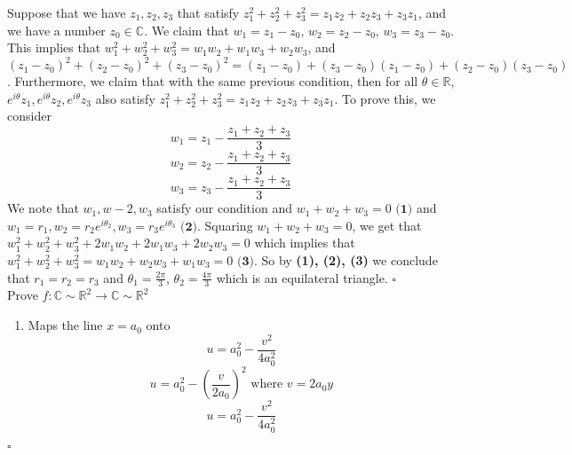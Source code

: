 \documentclass[12pt]{article}
\newcommand{\C}{\mathbb{C}}
\newcommand{\R}{\mathbb{R}}
\newenvironment{proof}{\noindent{\bf Proof.}}{\hfill $\square$\medskip}
\begin{document}
\begin{proof}
Suppose that we have $z_{1},z_{2},z_{3}$ that satisfy $z_{1}^{2}+z_{2}^{2}+z_{3}^{2}=z_{1}z_{2}+z_{2}z_{3}+z_{3}z_{1}$, and we have a number $z_{0}\in\C$. We claim that $w_{1} = z_{1}-z_{0}$, $w_{2}=z_{2}-z_{0}$, $w_{3}=z_{3}-z_{0}$. This implies that $w_{1}^{2}+w_{2}^{2}+w_{3}^{2}=w_{1}w_{2}+w_{1}w_{3}+w_{2}w_{3}$, and $(z_{1}-z_{0})^{2}+(z_{2}-z_{0})^{2}+(z_{3}-z_{0})^{2}=(z_{1}-z_{0})+(z_{3}-z_{0})(z_{1}-z_{0})+(z_{2}-z_{0})(z_{3}-z_{0})$. Furthermore, we claim that with the same previous condition, then for all $\theta\in\R$, $e^{i\theta}z_{1},e^{i\theta}z_{2}, e^{i\theta}z_{3}$ also satisfy $ z_{1}^{2}+z_{2}^{2}+z_{3}^{2}=z_{1}z_{2}+z_{2}z_{3}+z_{3}z_{1}$. To prove this, we consider
$$w_{1}=z_{1}-\frac{z_{1}+z_{2}+z_{3}}{3}$$
$$w_{2}=z_{2}-\frac{z_{1}+z_{2}+z_{3}}{3}$$
$$w_{3}=z_{3}-\frac{z_{1}+z_{2}+z_{3}}{3}$$
We note that $w_{1},w-{2},w_{3}$ satisfy our condition and $w_{1}+w_{2}+w_{3}=0\textbf{ (1)}$ and $w_{1}=r_{1},w_{2}=r_{2}e^{i\theta_{2}}, w_{3}=r_{3}e^{i\theta_{3}}\textbf{ (2)}$. Squaring $w_{1}+w_{2}+w_{3}=0$, we get that $w_{1}^{2}+w_{2}^{2}+w_{3}^{2}+2w_{1}w_{2}+2w_{1}w_{3}+2w_{2}w_{3}=0$ which implies that $w_{1}^{2}+w_{2}^{2}+w_{3}^{2}=w_{1}w_{2}+w_{2}w_{3}+w_{1}w_{3}=0\textbf{ (3)}$. So by \textbf{(1), (2), (3)} we conclude that $r_{1}=r_{2}=r_{3}$ and $\theta_{1}=\frac{2\pi}{3}$, $\theta_{2}=\frac{4\pi}{3}$ which is an equilateral triangle.
\end{proof}
\\


Prove $f: \mathbb{C}\sim\mathbb{R}^{2}\rightarrow \mathbb{C}\sim\mathbb{R}^{2}$

\begin{proof}
\begin{enumerate}[label=\textbf{(\alph*)}]
    \item Maps the line $x=a_{0}$ onto $$u=a_{0}^{2}-\frac{v^{2}}{4a_{0}^{2}}$$
    $$u=a_{0}^{2}-(\frac{v}{2a_{0}})^{2}\text{ where $v=2a_{0}y$}$$
    $$u=a_{0}^{2}-\frac{v^{2}}{4a_{0}^{2}}$$
\end{enumerate}
\end{proof}
\end{document}
